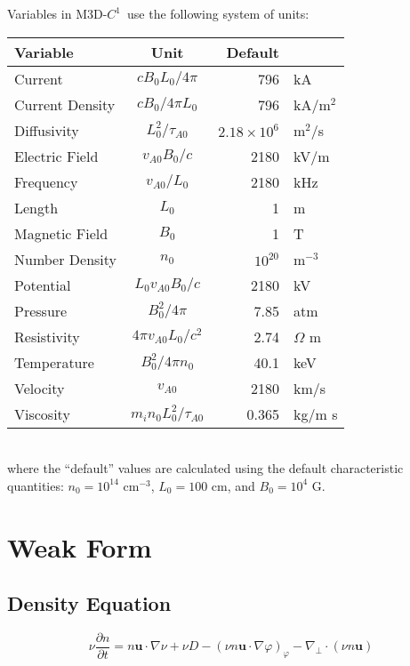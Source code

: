 \documentclass[letterpaper]{book}
\newcommand{\ddt}[1]{\frac{\partial #1}{\partial t}}
\renewcommand{\vec}[1]{\ensuremath{\mathbf{#1}}}
\newcommand{\tor}{\varphi}              %
\renewcommand{\u}{\vec{u}}
\newcommand{\codename}{\textsc{M3D-$C^1$}}
\newcommand{\grad}[1]{\nabla #1}
\newcommand{\divp}[1]{\nabla_\perp \cdot #1}
\begin{document}
Variables in \codename\ use the following system of units:

\begin{tabular}{lcrl}
  \textbf{Variable} & \textbf{Unit}              &  \textbf{Default} &\\
  \hline
  Current           & $c B_0 L_0 / 4\pi$         & 796       & kA\\
  Current Density   & $c B_0 / 4\pi L_0$         & 796       & kA/m$^2$\\
  Diffusivity       & $L_0^2/\tau_{A 0}$         & $2.18\times10^6$ & m$^2$/s\\
  Electric Field    & $v_{A 0} B_0/c$            & 2180      & kV/m\\
  Frequency         & $v_{A 0}/L_0$              & 2180      & kHz\\
  Length            & $L_0$                      & 1         & m \\
  Magnetic Field    & $B_0$                      & 1         & T\\
  Number Density    & $n_0$                      & $10^{20}$ & m$^{-3}$\\
  Potential         & $L_0 v_{A 0} B_0/c$        & 2180      & kV\\
  Pressure          & $B_0^2/4\pi$               & 7.85      & atm\\
  Resistivity       & $4\pi v_{A 0} L_0/c^2$     & 2.74      & $\Omega$ m\\
  Temperature       & $B_0^2/4\pi n_0$           & 40.1      & keV\\
  Velocity          & $v_{A 0}$                  & 2180      & km/s\\
  Viscosity         & $m_i n_0 L_0^2/\tau_{A 0}$ & 0.365     & kg/m s
\end{tabular}\\
where the ``default'' values are calculated using the default
characteristic quantities: $n_0 = 10^{14}$ cm$^{-3}$, $L_0 = 100$ cm,
and $B_0 = 10^4$ G.

\section{Weak Form}

\subsection{Density Equation}

\begin{equation}
  \nu \ddt{n} = 
  n \u \cdot \grad{\nu} 
  + \nu D 
  - (\nu n \u \cdot \grad{\tor})_\tor
  - \divp{(\nu n \u)}
\end{equation}
\end{document}
